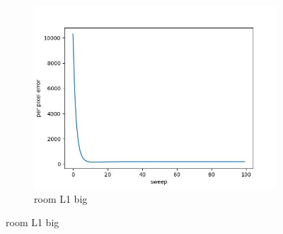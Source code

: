 \documentclass[11pt]{article}
\begin{document}
\begin{figure}[ht!]
\begin{subfigure}[]{0.333\linewidth}
        \includegraphics[width=\linewidth]{fig/loss/room_L1_big_loss.jpg}
        \caption{room L1 big}
    \end{subfigure}%
\end{figure}
\end{document}
